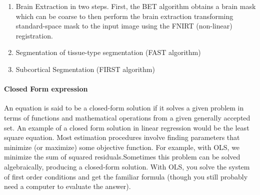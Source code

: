 \documentclass[9pt,twocolumn,twoside]{pnas-new}
\begin{document}
\begin{enumerate}
	\item Brain Extraction in two steps. First, the BET algorithm obtains a brain mask which can be coarse to then perform the brain extraction transforming standard-space mask to the input image using the FNIRT (non-linear) registration.
	\item Segmentation of tissue-type segmentation (FAST algorithm)
	\item Subcortical Segmentation (FIRST algorithm)
\end{enumerate}


\paragraph*{Closed Form expression}
An equation is said to be a closed-form solution if it solves a given problem in terms of functions and mathematical operations from a given generally accepted set.  An example of a closed form solution in linear regression would be the least square equation.
Most estimation procedures involve finding parameters that minimize (or maximize) some objective function. For example, with OLS, we minimize the sum of squared residuals.Sometimes this problem can be solved algebraically, producing a closed-form solution. With OLS, you solve the system of first order conditions and get the familiar formula (though you still probably need a computer to evaluate the answer).
\end{document}
